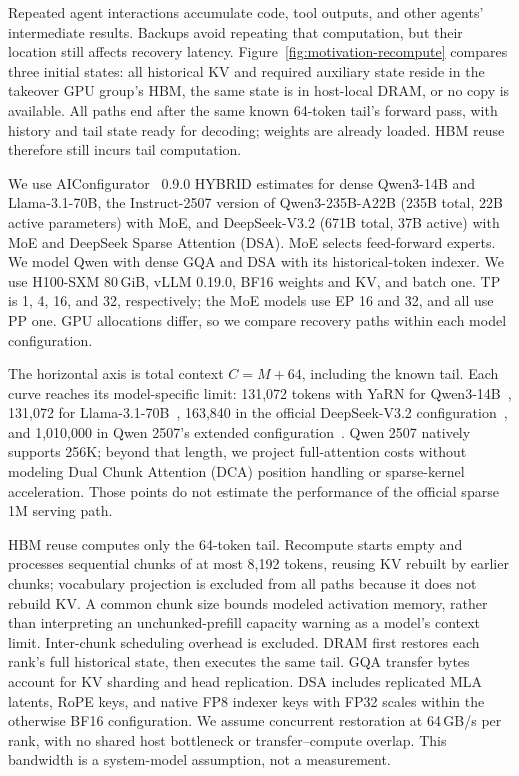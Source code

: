 

Repeated agent interactions accumulate code, tool outputs, and other
agents' intermediate results. Backups avoid repeating that computation,
but their location still affects recovery latency.
Figure~\ref{fig:motivation-recompute} compares three initial states:
all historical KV and required auxiliary state reside in the takeover
GPU group's HBM, the same state is in host-local DRAM, or no copy is
available. All paths end after the same known 64-token tail's forward
pass, with history and tail state ready for decoding; weights are
already loaded. HBM reuse therefore still incurs tail computation.

We use AIConfigurator~\cite{nvidia2026aiconfigurator} 0.9.0 HYBRID estimates
for dense Qwen3-14B and Llama-3.1-70B, the Instruct-2507 version of
Qwen3-235B-A22B (235B total, 22B active parameters) with MoE, and DeepSeek-V3.2
(671B total, 37B active) with MoE and DeepSeek Sparse Attention (DSA).
MoE selects feed-forward experts. We model Qwen with dense GQA and
DSA with its historical-token indexer. We use
H100-SXM 80\,GiB, vLLM 0.19.0, BF16 weights and KV, and batch one.
TP is 1, 4, 16, and 32, respectively; the MoE models use EP 16 and 32,
and all use PP one. GPU allocations differ, so we compare recovery
paths within each model configuration.

The horizontal axis is total context $C=M+64$, including the known tail.
Each curve reaches its model-specific limit: 131,072 tokens with YaRN
for Qwen3-14B~\cite{qwen2025technical}, 131,072 for
Llama-3.1-70B~\cite{meta2024llama31card}, 163,840 in the official
DeepSeek-V3.2 configuration~\cite{deepseek2025v32config}, and 1,010,000
in Qwen 2507's extended configuration~\cite{qwen2025instruct2507}.
Qwen 2507 natively supports 256K; beyond that length, we project
full-attention costs without modeling Dual Chunk Attention (DCA)
position handling or sparse-kernel acceleration. Those points do not
estimate the performance of the official sparse 1M serving path.

HBM reuse computes only the 64-token tail. Recompute starts empty and
processes sequential chunks of at most 8,192 tokens, reusing KV rebuilt
by earlier chunks; vocabulary projection is excluded
from all paths because it does not rebuild KV. A common chunk size bounds modeled
activation memory, rather than interpreting an unchunked-prefill
capacity warning as a model's context limit. Inter-chunk scheduling
overhead is excluded. DRAM first restores each rank's full historical
state, then executes the same tail. GQA transfer bytes account for KV
sharding and head replication. DSA includes replicated MLA latents,
RoPE keys, and native FP8 indexer keys with FP32 scales within the
otherwise BF16 configuration. We assume concurrent restoration at
64\,GB/s per rank, with no shared host bottleneck or transfer--compute
overlap. This bandwidth is a system-model assumption, not a measurement.


